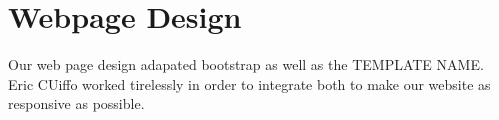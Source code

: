 \chapter{Webpage Design}

Our web page design adapated bootstrap as well as the TEMPLATE NAME. Eric CUiffo worked tirelessly in order to integrate both to make our website as responsive as possible. 
